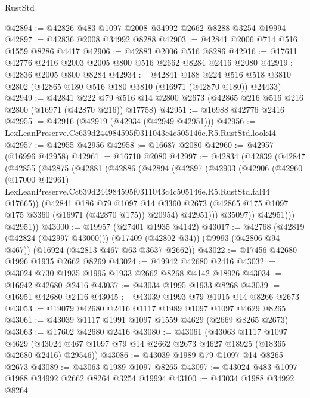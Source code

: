 \begin{lexlean}{RustStd}
\begin{coremodule}
@42894 := @42826 @483 @1097 @2008 @34992 @2662 @8288 @3254 @19994
@42897 := @42836 @2008 @34992 @8288
@42903 := @42841 @2006 @714 @516 @1559 @8286 @4417
@42906 := @42883 @2006 @516 @8286
@42916 := @17611 @42776 @2416 @2003 @2005 @800 @516 @2662 @8284 @2416 @2080
@42919 := @42836 @2005 @800 @8284
@42934 := @42841
    @188
    @224
    @516
    @518
    @3810
    @2802
    (@42865 @180 @516 @180 @3810 (@16971 (@42870 @180)) @24433)
@42949 := @42841
    @222
    @79
    @516
    @14
    @2800
    @2673
    (@42865 @216 @516 @216 @2800 (@16971 (@42870 @216)) @17758)
@42951 := @16988 @42776 @2416
@42955 := @42916 (@42919 (@42934 (@42949 @42951)))
@42956 := LexLeanPreserve.Cc639d244984595f0311043c4c505146e.R5.RustStd.look44
@42957 := @42955 @42956
@42958 := @16687 @2080
@42960 := @42957 (@16996 @42958)
@42961 := @16710 @2080
@42997 := @42834
    (@42839
      (@42847
        (@42855
          (@42875
            (@42881
              (@42886
                (@42894
                  (@42897
                    (@42903
                      (@42906
                        (@42960
                          (@17000 @42961)
                          LexLeanPreserve.Cc639d244984595f0311043c4c505146e.R5.RustStd.fal44
                          @17665))
                      (@42841
                        @186
                        @79
                        @1097
                        @14
                        @3360
                        @2673
                        (@42865 @175 @1097 @175 @3360 (@16971 (@42870 @175)) @20954)
                        @42951)))
                  @35097))
              @42951)))
        @42951))
@43000 := @19957 (@27401 @1935 @4142)
@43017 := @42768
    (@42819 (@42824 (@42997 @43000)))
    (@17409 (@42802 @34))
    (@9993 (@42806 @94 @467))
    (@16924 (@42813 @467 @63 @3637 @2662))
@43022 := @17456 @42680 @1996 @1935 @2662 @8269
@43024 := @19942 @42680 @2416
@43032 := @43024 @730 @1935 @1995 @1933 @2662 @8268 @4142 @18926
@43034 := @16942 @42680 @2416
@43037 := @43034 @1995 @1933 @8268
@43039 := @16951 @42680 @2416
@43045 := @43039 @1993 @79 @1915 @14 @8266 @2673
@43053 := @19079 @42680 @2416 @1117 @1989 @1097 @1097 @4629 @8265
@43061 := @43039 @1117 @1991 @1097 @1559 @4629 (@2669 @8265 @2673)
@43063 := @17602 @42680 @2416
@43080 := @43061
    (@43063
      @1117
      @1097
      @4629
      (@43024 @467 @1097 @79 @14 @2662 @2673 @4627 @18925 (@18365 @42680 @2416) @29546))
@43086 := @43039 @1989 @79 @1097 @14 @8265 @2673
@43089 := @43063 @1989 @1097 @8265
@43097 := @43024 @483 @1097 @1988 @34992 @2662 @8264 @3254 @19994
@43100 := @43034 @1988 @34992 @8264

\end{coremodule}
\end{lexlean}
